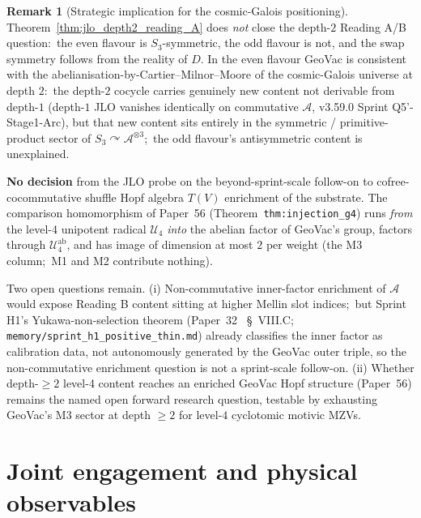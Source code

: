 \documentclass[11pt,a4paper]{article}
\theoremstyle{plain}
\theoremstyle{definition}
\newtheorem{remark}[theorem]{Remark}
\begin{document}
\begin{remark}[Strategic implication for the cosmic-Galois
positioning]
\label{rem:reading_A_strategic}
Theorem~\ref{thm:jlo_depth2_reading_A} does \emph{not} close the depth-$2$
Reading A/B question:\ the even flavour is $S_3$-symmetric, the odd flavour is
not, and the swap symmetry follows from the reality of $D$.  In the even
flavour GeoVac is consistent with
the abelianisation-by-Cartier--Milnor--Moore of the cosmic-Galois
universe at depth $2$:\ the depth-$2$ cocycle
carries genuinely new content not derivable from depth-$1$
(depth-$1$ JLO vanishes identically on commutative $\mathcal{A}$,
v3.59.0 Sprint Q5'-Stage1-Arc), but that new content sits entirely
in the symmetric / primitive-product sector of
$S_3 \curvearrowright \mathcal{A}^{\otimes 3}$;\ the odd flavour's
antisymmetric content is unexplained.

\textbf{No decision} from the JLO probe on the beyond-sprint-scale
follow-on to cofree-cocommutative shuffle Hopf algebra $T(V)$
enrichment of the substrate.  The comparison homomorphism of Paper~56
(Theorem~\texttt{thm:injection\_g4}) runs \emph{from} the level-4
unipotent radical $\mathcal{U}_4$ \emph{into} the abelian factor of
GeoVac's group, factors through $\mathcal{U}_4^{\mathrm{ab}}$, and has
image of dimension at most $2$ per weight (the M3 column;\ M1 and M2
contribute nothing).

Two open questions remain.  (i) Non-commutative inner-factor
enrichment of $\mathcal{A}$ would expose Reading B content sitting
at higher Mellin slot indices;\ but Sprint H1's Yukawa-non-selection
theorem (Paper~32~\cite{loutey_paper32} \S~VIII.C;
\texttt{memory/sprint\_h1\_positive\_thin.md}) already classifies
the inner factor as calibration data, not autonomously generated
by the GeoVac outer triple, so the non-commutative enrichment
question is not a sprint-scale follow-on.  (ii) Whether depth-$\ge 2$
level-4 content reaches an enriched GeoVac Hopf structure (Paper~56)
remains the named open forward research question, testable
by exhausting GeoVac's M3 sector at depth $\ge 2$ for level-$4$
cyclotomic motivic MZVs.
\end{remark}

\section{Joint engagement and physical observables}
\label{sec:joint}
\end{document}
